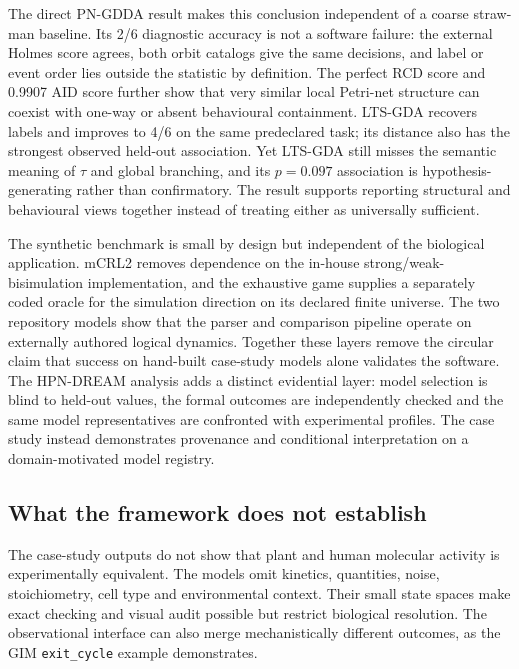\documentclass[pdflatex,sn-mathphys-ay]{sn-jnl}
\theoremstyle{definition}
\newcommand{\TAU}{\tau}
\begin{document}
The direct PN-GDDA result makes this conclusion independent of a coarse
straw-man baseline. Its 2/6 diagnostic accuracy is not a software failure: the
external Holmes score agrees, both orbit catalogs give the same decisions, and
label or event order lies outside the statistic by definition. The perfect RCD
score and 0.9907 AID score further show that very similar local Petri-net
structure can coexist with one-way or absent behavioural containment. LTS-GDA
recovers labels and improves to 4/6 on the same predeclared task; its distance
also has the strongest observed held-out association. Yet LTS-GDA still misses
the semantic meaning of $\TAU$ and global branching, and its $p=0.097$
association is hypothesis-generating rather than confirmatory. The result
supports reporting structural and behavioural views together instead of
treating either as universally sufficient.

The synthetic benchmark is small by design but independent of the biological
application. mCRL2 removes dependence on the in-house strong/weak-bisimulation
implementation, and the exhaustive game supplies a separately coded oracle for
the simulation direction on its declared finite universe. The two repository
models show that the parser and comparison pipeline
operate on externally authored logical dynamics. Together these layers remove
the circular claim that success on hand-built case-study models alone validates
the software. The HPN-DREAM analysis adds a distinct evidential layer: model
selection is blind to held-out values, the formal outcomes are independently
checked and the same model representatives are confronted with experimental
profiles. The case study instead demonstrates provenance and conditional
interpretation on a domain-motivated model registry.

\subsection{What the framework does not establish}\label{sec:discussion-limits}

The case-study outputs do not show that plant and human molecular activity is
experimentally equivalent. The models omit kinetics, quantities, noise,
stoichiometry, cell type and environmental context. Their small state spaces make
exact checking and visual audit possible but restrict biological resolution. The
observational interface can also merge mechanistically different outcomes, as
the GIM \texttt{exit\_cycle} example demonstrates.
\end{document}
